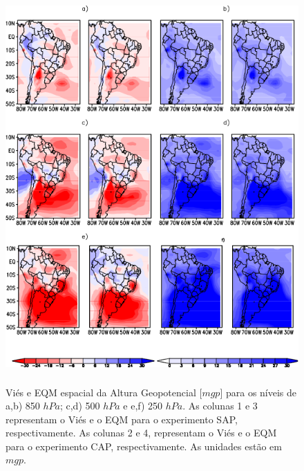 \begin{figure}[!h]
\centering
\includegraphics[height=15cm]{./figs/campo_vies_eqm-zgeo.png}
\caption{Viés e EQM espacial da Altura Geopotencial [$mgp$] para os níveis de a,b) 850 $hPa$; c,d) 500 $hPa$ e e,f) 250 $hPa$. As colunas 1 e 3 representam o Viés e o EQM para o experimento SAP, respectivamente. As colunas 2 e 4, representam o Viés e o EQM para o experimento CAP, respectivamente. As unidades estão em $mgp$.}
\label{fig30b}
\end{figure}

\break

